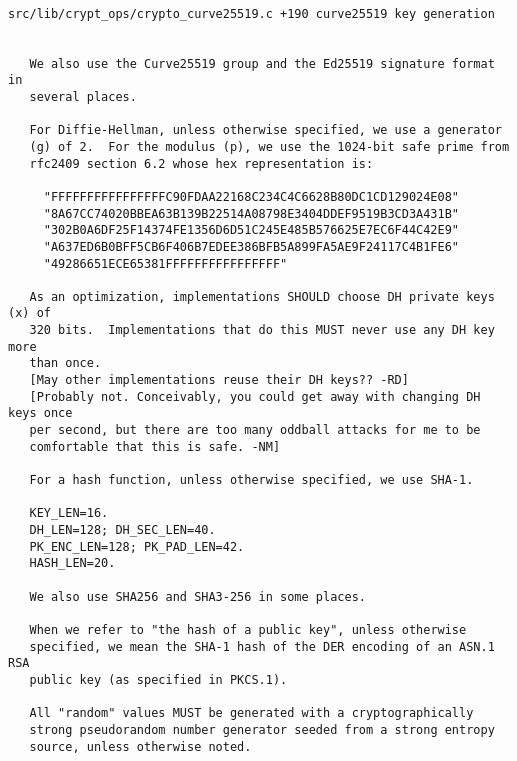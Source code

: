 \begin{lstlisting}

src/lib/crypt_ops/crypto_curve25519.c +190 curve25519 key generation


   We also use the Curve25519 group and the Ed25519 signature format in
   several places.

   For Diffie-Hellman, unless otherwise specified, we use a generator
   (g) of 2.  For the modulus (p), we use the 1024-bit safe prime from
   rfc2409 section 6.2 whose hex representation is:

     "FFFFFFFFFFFFFFFFC90FDAA22168C234C4C6628B80DC1CD129024E08"
     "8A67CC74020BBEA63B139B22514A08798E3404DDEF9519B3CD3A431B"
     "302B0A6DF25F14374FE1356D6D51C245E485B576625E7EC6F44C42E9"
     "A637ED6B0BFF5CB6F406B7EDEE386BFB5A899FA5AE9F24117C4B1FE6"
     "49286651ECE65381FFFFFFFFFFFFFFFF"

   As an optimization, implementations SHOULD choose DH private keys (x) of
   320 bits.  Implementations that do this MUST never use any DH key more
   than once.
   [May other implementations reuse their DH keys?? -RD]
   [Probably not. Conceivably, you could get away with changing DH keys once
   per second, but there are too many oddball attacks for me to be
   comfortable that this is safe. -NM]

   For a hash function, unless otherwise specified, we use SHA-1.

   KEY_LEN=16.
   DH_LEN=128; DH_SEC_LEN=40.
   PK_ENC_LEN=128; PK_PAD_LEN=42.
   HASH_LEN=20.

   We also use SHA256 and SHA3-256 in some places.

   When we refer to "the hash of a public key", unless otherwise
   specified, we mean the SHA-1 hash of the DER encoding of an ASN.1 RSA
   public key (as specified in PKCS.1).

   All "random" values MUST be generated with a cryptographically
   strong pseudorandom number generator seeded from a strong entropy
   source, unless otherwise noted.
\end{lstlisting}




